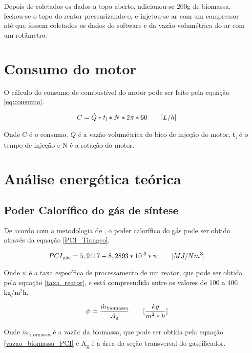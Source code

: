 Depois de coletados os dados a topo aberto, adicionou-se 200g de biomassa, fechou-se o topo do reator pressurizando-o, e injetou-se ar com um compressor até que fossem coletados os dados do software e da vazão volumétrica do ar com um rotâmetro.

\section{Consumo do motor}

O cálculo do consumo de combustível do motor pode ser feito pela equação \ref{eq:consumo}.

\begin{equation} \label{eq:consumo}
	C = \dot{Q} * t\textsubscript{i} * N * {2 \pi*60} \qquad [L/h]
\end{equation}

Onde C é o consumo,
$\dot{Q}$ é a vazão volumétrica do bico de injeção do motor,
t\textsubscript{i} é o tempo de injeção e
N é a rotação do motor.

\section{Análise energética teórica}
\subsection{Poder Calorífico do gás de síntese}

De acordo com a metodologia de \cite{tiangco1986}, o poder calorífico do gás pode ser obtido através da equação \ref{PCI_Tiangco}.

\begin{equation} \label{PCI_Tiangco}
	PCI\textsubscript{gás} = 5,9417 - 8,2893*10\textsuperscript{-3} * \psi \qquad [MJ/Nm^3]
\end{equation}

Onde $\psi$ é a taxa específica de processamento de um reator, que pode ser obtida pela equação \ref{taxa_reator}, e está compreendida entre os valores de 100 a 400 kg/m$^2$h.

\begin{equation} \label{taxa_reator}
	\psi = \frac{\dot{m}\textsubscript{biomassa}}{A\textsubscript{g}} \qquad [\frac{kg}{m^2*h}]
\end{equation}

Onde $\dot{m}$\textsubscript{biomassa} é a vazão da biomassa, que pode ser obtida pela equação \ref{vazao_biomassa_PCI} e A\textsubscript{g} é a área da seção transversal do gaseificador.

